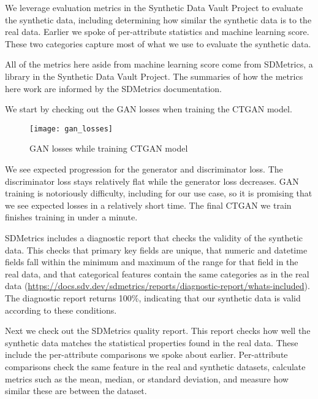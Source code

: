 \documentclass[sigconf, authorversion, nonacm]{acmart}
\begin{document}
    We leverage evaluation metrics in the Synthetic Data Vault Project to evaluate the synthetic data, including determining how similar the synthetic data is to the real data. Earlier we spoke of per-attribute statistics and machine learning score. These two categories capture most of what we use to evaluate the synthetic data.

    All of the metrics here aside from machine learning score come from SDMetrics, a library in the Synthetic Data Vault Project. The summaries of how the metrics here work are informed by the SDMetrics documentation.

    We start by checking out the GAN losses when training the CTGAN model.

    \begin{figure}[h]
        \centering
        \caption{GAN losses while training CTGAN model}
        \texttt{[image: gan\_losses]}
    \end{figure}

    We see expected progression for the generator and discriminator loss. The discriminator loss stays relatively flat while the generator loss decreases. GAN training is notoriously difficulty, including for our use case, so it is promising that we see expected losses in a relatively short time. The final CTGAN we train finishes training in under a minute.

    SDMetrics includes a diagnostic report that checks the validity of the synthetic data. This checks that primary key fields are unique, that numeric and datetime fields fall within the minimum and maximum of the range for that field in the real data, and that categorical features contain the same categories as in the real data (\href{https://docs.sdv.dev/sdmetrics/reports/diagnostic-report/whats-included}{https://docs.sdv.dev/sdmetrics/reports/diagnostic-report/whats-included}). The diagnostic report returns 100\%, indicating that our synthetic data is valid according to these conditions.

    Next we check out the SDMetrics quality report. This report checks how well the synthetic data matches the statistical properties found in the real data. These include the per-attribute comparisons we spoke about earlier. Per-attribute comparisons check the same feature in the real and synthetic datasets, calculate metrics such as the mean, median, or standard deviation, and measure how similar these are between the dataset.
\end{document}
